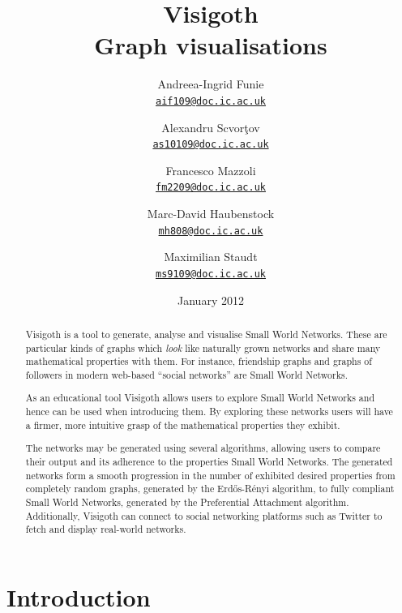 \documentclass[a4paper,11pt,titlepage]{article}
\let\stdhref\href
\renewcommand{\href}[2]{\stdhref{#1}{\texttt{#2}}}
\newcommand{\mailto}[1]{\href{mailto:#1}{#1}}
\let\stdsection\section         %
\renewcommand{\section}{\newpage\stdsection}
\begin{document}
\title{\Huge Visigoth\\\Large Graph visualisations}
\author{
  Andreea-Ingrid Funie\\\mailto{aif109@doc.ic.ac.uk}\and
  Alexandru Scvor\c tov\\\mailto{as10109@doc.ic.ac.uk}\and
  Francesco Mazzoli\\\mailto{fm2209@doc.ic.ac.uk}\and
  Marc-David Haubenstock\\\mailto{mh808@doc.ic.ac.uk}\and
  Maximilian Staudt\\\mailto{ms9109@doc.ic.ac.uk}
}
\date{January 2012}
\maketitle

\begin{abstract}

Visigoth is a tool to generate, analyse and visualise Small World
Networks. These are particular kinds of graphs which \emph{look} like
naturally grown networks and share many mathematical properties with them.
For instance, friendship graphs and graphs of followers in modern
web-based ``social networks'' are Small World Networks.

As an educational tool Visigoth allows users to explore Small
World Networks and hence can be used when introducing them. By
exploring these networks users will have a firmer, more intuitive
grasp of the mathematical properties they exhibit.

The networks may be generated using several algorithms,
allowing users to compare their output and its adherence to
the properties Small World Networks. The
generated networks form a smooth progression in the number of
exhibited desired properties from completely random graphs,
generated by the Erd\H{o}s-R\'{e}nyi algorithm, to fully compliant
Small World Networks,
generated by the Preferential Attachment algorithm. Additionally,
Visigoth can connect to social networking platforms such as Twitter to
fetch and display real-world networks.
\end{abstract}

\tableofcontents




\section{Introduction}
\end{document}
